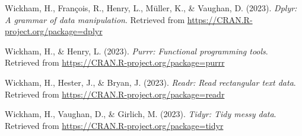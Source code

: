\documentclass[
  english,
  man,floatsintext]{apa6}
\newlength{\cslhangindent}
\newenvironment{CSLReferences}[2] %
 {\begin{list}{}{%
  \setlength{\itemindent}{0pt}
  \setlength{\leftmargin}{0pt}
  \setlength{\parsep}{0pt}
  \ifodd #1
   \setlength{\leftmargin}{\cslhangindent}
   \setlength{\itemindent}{-1\cslhangindent}
  \fi
  \setlength{\itemsep}{#2\baselineskip}}}
 {\end{list}}
\begin{document}
\begin{CSLReferences}{1}{0}
Wickham, H., François, R., Henry, L., Müller, K., \& Vaughan, D. (2023). \emph{Dplyr: A grammar of data manipulation}. Retrieved from \url{https://CRAN.R-project.org/package=dplyr}

Wickham, H., \& Henry, L. (2023). \emph{Purrr: Functional programming tools}. Retrieved from \url{https://CRAN.R-project.org/package=purrr}

Wickham, H., Hester, J., \& Bryan, J. (2023). \emph{Readr: Read rectangular text data}. Retrieved from \url{https://CRAN.R-project.org/package=readr}

Wickham, H., Vaughan, D., \& Girlich, M. (2023). \emph{Tidyr: Tidy messy data}. Retrieved from \url{https://CRAN.R-project.org/package=tidyr}

\end{CSLReferences}
\end{document}
